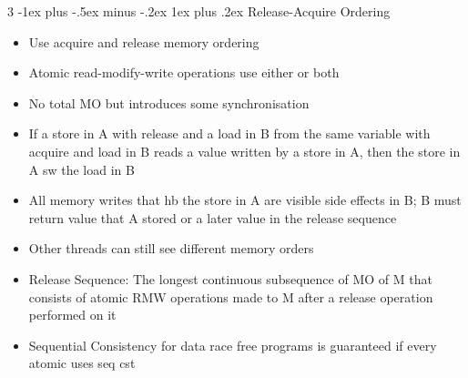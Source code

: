 \documentclass[10pt, landscape]{article}
\makeatletter
\renewcommand{\subsection}{\@startsection{subsection}{3}{0mm}%
                                {-1ex plus -.5ex minus -.2ex}%
                                {1ex plus .2ex}%
                                {\normalfont\small\bfseries}}%
\makeatother
\begin{document}
\begin{multicols*}{3}
\subsection{Release-Acquire Ordering}
\begin{itemize}
    \item Use acquire and release memory ordering
    \item Atomic read-modify-write operations use either or both
    \item No total MO but introduces some synchronisation
    \item If a store in A with release and a load in B from the same variable with acquire and load in B reads a value written by a store in A, then the store in A sw the load in B
    \item All memory writes that hb the store in A are visible side effects in B; B must return value that A stored or a later value in the release sequence
    \item Other threads can still see different memory orders
    \item Release Sequence: The longest continuous subsequence of MO of M that consists of atomic RMW operations made to M after a release operation performed on it
    \item Sequential Consistency for data race free programs is guaranteed if every atomic uses seq cst
\end{itemize}


\end{multicols*}
\end{document}
